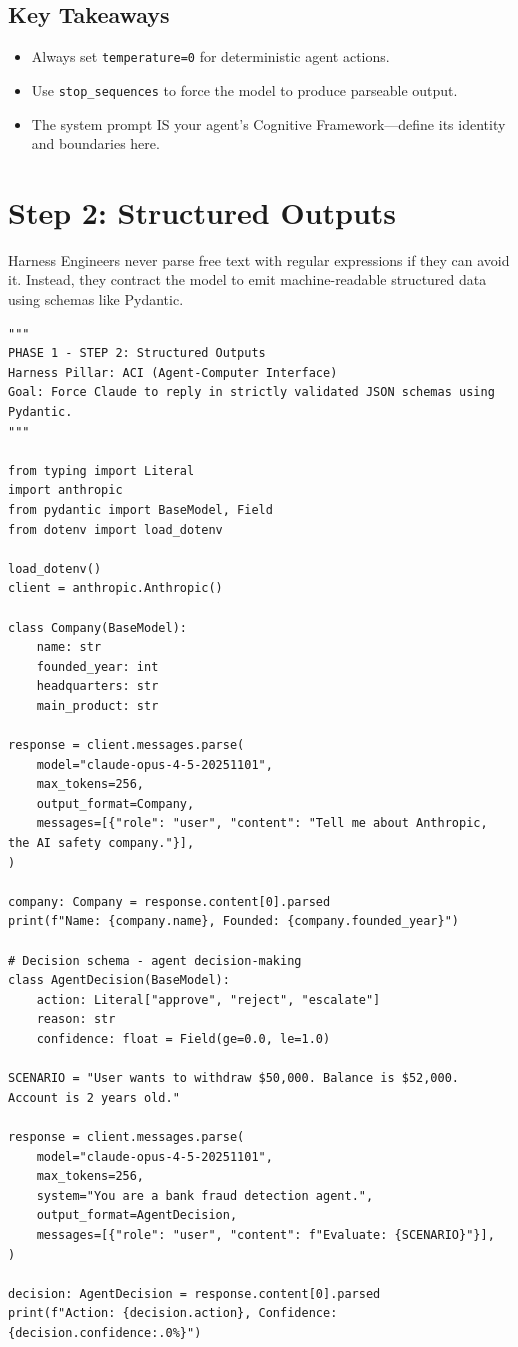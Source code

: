 \subsection*{Key Takeaways}
\begin{itemize}
    \item Always set \texttt{temperature=0} for deterministic agent actions.
    \item Use \texttt{stop\_sequences} to force the model to produce parseable output.
    \item The system prompt IS your agent's Cognitive Framework---define its identity and boundaries here.
\end{itemize}

\section{Step 2: Structured Outputs}
Harness Engineers never parse free text with regular expressions if they can avoid it. Instead, they contract the model to emit machine-readable structured data using schemas like Pydantic.

\begin{lstlisting}[caption={step2\_structured\_outputs.py}, label={lst:step2}]
"""
PHASE 1 - STEP 2: Structured Outputs
Harness Pillar: ACI (Agent-Computer Interface)
Goal: Force Claude to reply in strictly validated JSON schemas using Pydantic.
"""

from typing import Literal
import anthropic
from pydantic import BaseModel, Field
from dotenv import load_dotenv

load_dotenv()
client = anthropic.Anthropic()

class Company(BaseModel):
    name: str
    founded_year: int
    headquarters: str
    main_product: str

response = client.messages.parse(
    model="claude-opus-4-5-20251101",
    max_tokens=256,
    output_format=Company,
    messages=[{"role": "user", "content": "Tell me about Anthropic, the AI safety company."}],
)

company: Company = response.content[0].parsed
print(f"Name: {company.name}, Founded: {company.founded_year}")

# Decision schema - agent decision-making
class AgentDecision(BaseModel):
    action: Literal["approve", "reject", "escalate"]
    reason: str
    confidence: float = Field(ge=0.0, le=1.0)

SCENARIO = "User wants to withdraw $50,000. Balance is $52,000. Account is 2 years old."

response = client.messages.parse(
    model="claude-opus-4-5-20251101",
    max_tokens=256,
    system="You are a bank fraud detection agent.",
    output_format=AgentDecision,
    messages=[{"role": "user", "content": f"Evaluate: {SCENARIO}"}],
)

decision: AgentDecision = response.content[0].parsed
print(f"Action: {decision.action}, Confidence: {decision.confidence:.0%}")
\end{lstlisting}

